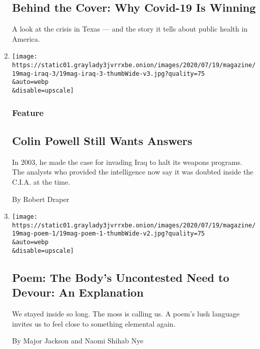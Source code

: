 \begin{enumerate}
  \hypertarget{behind-the-cover-why-covid-19-is-winning}{%
  \subsection{Behind the Cover: Why Covid-19 Is
  Winning}\label{behind-the-cover-why-covid-19-is-winning}}

  A look at the crisis in Texas --- and the story it tells about public
  health in America.
\item
  \href{/2020/07/16/magazine/colin-powell-iraq-war.html}{}

  \texttt{[image: https://static01.graylady3jvrrxbe.onion/images/2020/07/19/magazine/19mag-iraq-3/19mag-iraq-3-thumbWide-v3.jpg?quality=75\\\&auto=webp\\\&disable=upscale]}

  \hypertarget{feature-3}{%
  \subsubsection{Feature}\label{feature-3}}

  \hypertarget{colin-powell-still-wants-answers}{%
  \subsection{Colin Powell Still Wants
  Answers}\label{colin-powell-still-wants-answers}}

  In 2003, he made the case for invading Iraq to halt its weapons
  programs. The analysts who provided the intelligence now say it was
  doubted inside the C.I.A. at the time.

  By Robert Draper
\item
  \href{/2020/07/16/magazine/poem-the-bodys-uncontested-need-to-devour-an-explanation.html}{}

  \texttt{[image: https://static01.graylady3jvrrxbe.onion/images/2020/07/19/magazine/19mag-poem-1/19mag-poem-1-thumbWide-v2.jpg?quality=75\\\&auto=webp\\\&disable=upscale]}

  \hypertarget{poem-the-bodys-uncontested-need-to-devour-an-explanation}{%
  \subsection{Poem: The Body's Uncontested Need to Devour: An
  Explanation}\label{poem-the-bodys-uncontested-need-to-devour-an-explanation}}

  We stayed inside so long. The moss is calling us. A poem's lush
  language invites us to feel close to something elemental again.

  By Major Jackson and Naomi Shihab Nye
\end{enumerate}

